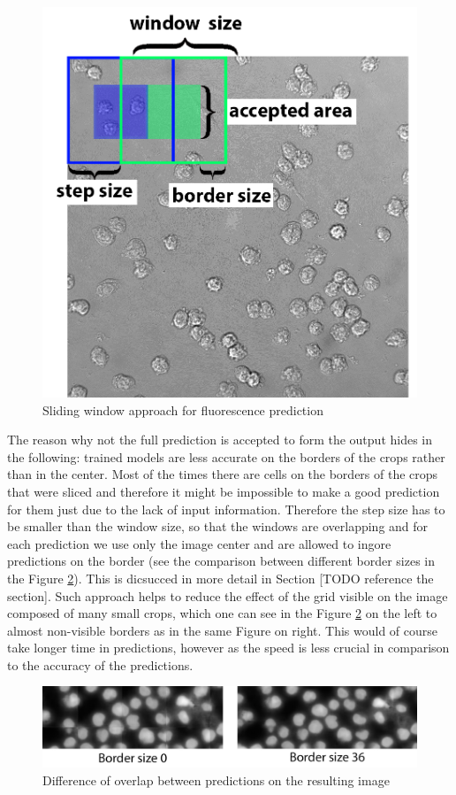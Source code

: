 \begin{figure}[H]
	\begin{center}
		\includegraphics[width=0.3\linewidth]{bilder/sliding-window.png}
		\caption{Sliding window approach for fluorescence prediction}\label{fig:sliding-window}
	\end{center}
\end{figure}
The reason why not the full prediction is accepted to form the output hides in the following: trained models are less accurate on the borders of the crops rather than in the center. Most of the times there are cells on the borders of the crops that were sliced and therefore it might be impossible to make a good prediction for them just due to the lack of input information. Therefore the step size has to be smaller than the window size, so that the windows are overlapping and for each prediction we use only the image center and are allowed to ingore predictions on the border (see the comparison between different border sizes in the Figure \ref{fig:crops-combination}). This is dicsucced in more detail in Section [TODO reference the section]. Such approach helps to reduce the effect of the grid visible on the image composed of many small crops, which one can see in the Figure \ref{fig:crops-combination} on the left to almost non-visible borders as in the same Figure on right. This would of course take longer time in predictions, however as the speed is less crucial in comparison to the accuracy of the predictions.

\begin{figure}[htb]
	\begin{center}
		\includegraphics[width=\linewidth]{bilder/crops_combination/crops-combination.png}
		\caption{Difference of overlap between predictions on the resulting image}\label{fig:crops-combination}
	\end{center}
\end{figure}